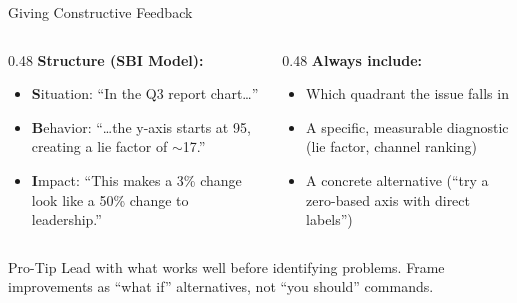\documentclass[10pt]{beamer}
\begin{document}
\begin{frame}{Giving Constructive Feedback}
  \begin{columns}[T]
    \begin{column}{0.48\textwidth}
      \textbf{Structure (SBI Model):}
      \begin{itemize}
        \item \textbf{S}ituation: ``In the Q3 report chart\ldots''
        \item \textbf{B}ehavior: ``\ldots the y-axis starts at 95,
              creating a lie factor of $\sim$17.''
        \item \textbf{I}mpact: ``This makes a 3\% change look like
              a 50\% change to leadership.''
      \end{itemize}
    \end{column}
    \begin{column}{0.48\textwidth}
      \textbf{Always include:}
      \begin{itemize}
        \item Which quadrant the issue falls in
        \item A specific, measurable diagnostic
              (lie factor, channel ranking)
        \item A concrete alternative (``try a
              zero-based axis with direct labels'')
      \end{itemize}
    \end{column}
  \end{columns}

  \vspace{6pt}
  \begin{alertblock}{Pro-Tip}
    Lead with what works well before identifying problems. Frame
    improvements as ``what if'' alternatives, not ``you should'' commands.
  \end{alertblock}
\end{frame}
\end{document}
